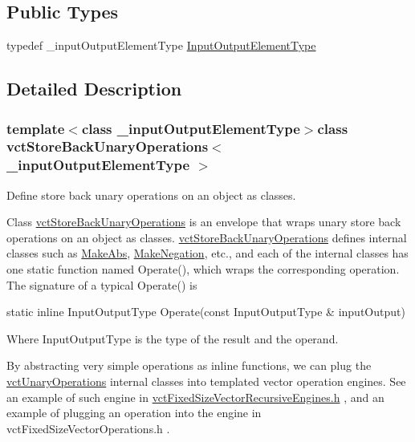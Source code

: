 \subsection*{Public Types}
\begin{DoxyCompactItemize}
\item 
typedef \-\_\-input\-Output\-Element\-Type \hyperlink{classvct_store_back_unary_operations_a8af17faaa73a8d090094d468eee32062}{Input\-Output\-Element\-Type}
\end{DoxyCompactItemize}


\subsection{Detailed Description}
\subsubsection*{template$<$class \-\_\-input\-Output\-Element\-Type$>$class vct\-Store\-Back\-Unary\-Operations$<$ \-\_\-input\-Output\-Element\-Type $>$}

Define store back unary operations on an object as classes. 

Class \hyperlink{classvct_store_back_unary_operations}{vct\-Store\-Back\-Unary\-Operations} is an envelope that wraps unary store back operations on an object as classes. \hyperlink{classvct_store_back_unary_operations}{vct\-Store\-Back\-Unary\-Operations} defines internal classes such as \hyperlink{classvct_store_back_unary_operations_1_1_make_abs}{Make\-Abs}, \hyperlink{classvct_store_back_unary_operations_1_1_make_negation}{Make\-Negation}, etc., and each of the internal classes has one static function named Operate(), which wraps the corresponding operation. The signature of a typical Operate() is


\begin{DoxyPre} static inline InputOutputType Operate(const InputOutputType & inputOutput)
\end{DoxyPre}


Where Input\-Output\-Type is the type of the result and the operand.

By abstracting very simple operations as inline functions, we can plug the \hyperlink{classvct_unary_operations}{vct\-Unary\-Operations} internal classes into templated vector operation engines. See an example of such engine in \hyperlink{vct_fixed_size_vector_recursive_engines_8h}{vct\-Fixed\-Size\-Vector\-Recursive\-Engines.\-h} , and an example of plugging an operation into the engine in vct\-Fixed\-Size\-Vector\-Operations.\-h .


